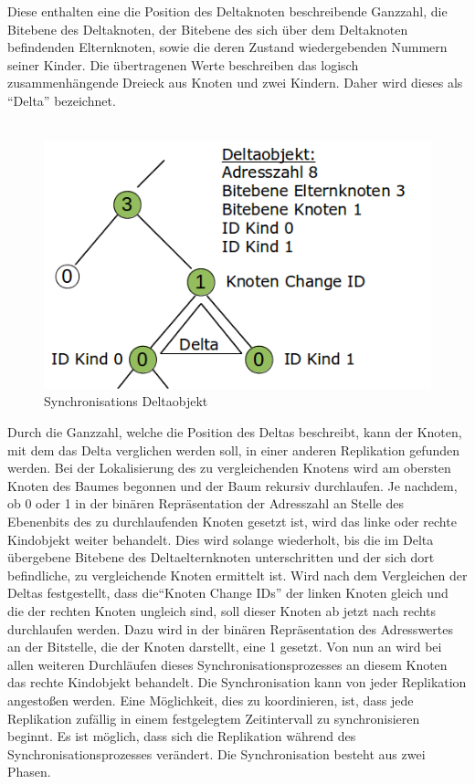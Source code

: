 \documentclass[a4paper,11pt,oneside,%
headsepline,												%
footsepline,												%
bibtotocnumbered									%
]{scrreprt}
\begin{document}
 Diese enthalten eine die Position des Deltaknoten beschreibende Ganzzahl, die Bitebene des  Deltaknoten, der Bitebene des sich über dem Deltaknoten befindenden Elternknoten, sowie die deren Zustand wiedergebenden Nummern seiner Kinder.
Die übertragenen Werte beschreiben das logisch zusammenhängende Dreieck aus Knoten und zwei Kindern. Daher wird dieses als \enquote{Delta} bezeichnet.\\\\
\begin{figure}[h!]
  \begin{center}
    \includegraphics[width=.5\linewidth]{bilder/SynchroDelta.png}
  \end{center}
 \caption{Synchronisations Deltaobjekt}
\end{figure}
Durch die Ganzzahl, welche die Position des Deltas beschreibt, kann der Knoten, mit dem das Delta verglichen werden soll, in einer anderen Replikation gefunden werden. Bei der Lokalisierung des zu vergleichenden Knotens wird am obersten Knoten des Baumes begonnen und der Baum rekursiv durchlaufen. Je nachdem, ob 0 oder 1 in der binären Repräsentation der Adresszahl an Stelle des Ebenenbits des zu durchlaufenden Knoten gesetzt ist, wird das linke oder rechte Kindobjekt weiter behandelt. Dies wird solange wiederholt, bis die im Delta übergebene Bitebene des Deltaelternknoten unterschritten und der sich dort befindliche, zu vergleichende Knoten ermittelt ist.
Wird nach dem Vergleichen der Deltas festgestellt, dass die\enquote{Knoten Change IDs} der linken Knoten gleich und die der rechten Knoten ungleich sind, soll dieser Knoten ab jetzt nach rechts durchlaufen werden. Dazu wird in der binären Repräsentation des Adresswertes an der Bitstelle, die der Knoten darstellt, eine 1 gesetzt. Von nun an wird bei allen weiteren Durchläufen dieses Synchronisationsprozesses an diesem Knoten das rechte Kindobjekt behandelt.
Die Synchronisation kann von jeder Replikation angestoßen werden. Eine Möglichkeit, dies zu koordinieren, ist, dass jede Replikation zufällig in einem festgelegtem Zeitintervall zu synchronisieren beginnt. Es ist möglich, dass sich die Replikation während des Synchronisationsprozesses verändert. Die Synchronisation besteht aus zwei Phasen.  
\end{document}
